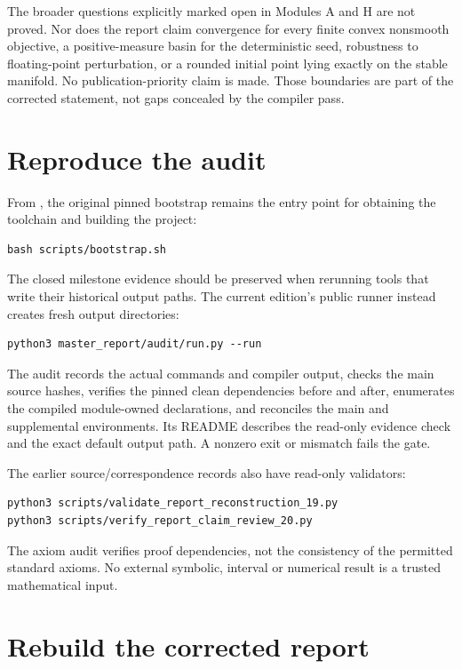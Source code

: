 The broader questions explicitly marked open in Modules A and H are not proved. Nor does the report claim convergence for every finite convex nonsmooth objective, a positive-measure basin for the deterministic seed, robustness to floating-point perturbation, or a rounded initial point lying exactly on the stable manifold. No publication-priority claim is made. Those boundaries are part of the corrected statement, not gaps concealed by the compiler pass.

\section{Reproduce the audit}\label{reproduce-the-audit}

From , the original pinned bootstrap remains the entry point for obtaining the toolchain and building the project:
\begin{verbatim}
bash scripts/bootstrap.sh
\end{verbatim}
The closed milestone evidence should be preserved when rerunning tools that write their historical output paths. The current edition's public runner instead creates fresh output directories:
\begin{verbatim}
python3 master_report/audit/run.py --run
\end{verbatim}
The audit records the actual commands and compiler output, checks the main source hashes, verifies the pinned clean dependencies before and after, enumerates the compiled module-owned declarations, and reconciles the main and supplemental environments. Its README describes the read-only evidence check and the exact default output path. A nonzero exit or mismatch fails the gate.

The earlier source/correspondence records also have read-only validators:
\begin{verbatim}
python3 scripts/validate_report_reconstruction_19.py
python3 scripts/verify_report_claim_review_20.py
\end{verbatim}
The axiom audit verifies proof dependencies, not the consistency of the permitted standard axioms. No external symbolic, interval or numerical result is a trusted mathematical input.

\section{Rebuild the corrected report}\label{rebuild-the-report}

